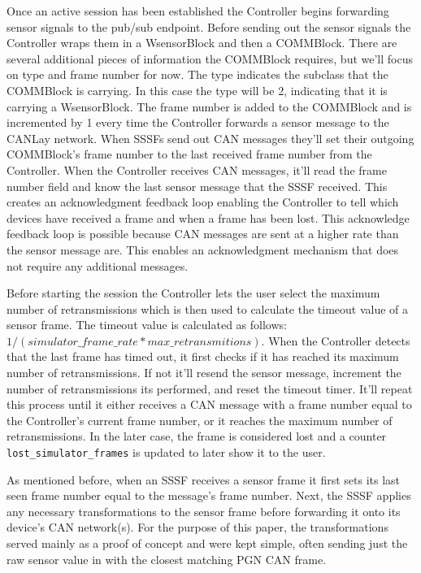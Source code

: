 \documentclass[letterpaper,twocolumn,12pt]{article}
\begin{document}
Once an active session has been established the Controller begins forwarding sensor signals to the pub/sub endpoint. Before sending out the sensor signals the Controller wraps them in a WsensorBlock and then a COMMBlock. There are several additional pieces of information the COMMBlock requires, but we'll focus on type and frame number for now. The type indicates the subclass that the COMMBlock is carrying. In this case the type will be 2, indicating that it is carrying a WsensorBlock. The frame number is added to the COMMBlock and is incremented by 1 every time the Controller forwards a sensor message to the CANLay network. When SSSFs send out CAN messages they’ll set their outgoing COMMBlock's frame number to the last received frame number from the Controller. When the Controller receives CAN messages, it'll read the frame number field and know the last sensor message that the SSSF received. This creates an acknowledgment feedback loop enabling the Controller to tell which devices have received a frame and when a frame has been lost. This acknowledge feedback loop is possible because CAN messages are sent at a higher rate than the sensor message are. This enables an acknowledgment mechanism that does not require any additional messages.

Before starting the session the Controller lets the user select the maximum number of retransmissions which is then used to calculate the timeout value of a sensor frame. The timeout value is calculated as follows: $1/(simulator\_frame\_rate * max\_retransmitions)$. When the Controller detects that the last frame has timed out, it first checks if it has reached its maximum number of retransmissions. If not it'll resend the sensor message, increment the number of retransmissions its performed, and reset the timeout timer. It’ll repeat this process until it either receives a CAN message with a frame number equal to the Controller's current frame number, or it reaches the maximum number of retransmissions. In the later case, the frame is considered lost and a counter \texttt{lost\_simulator\_frames} is updated to later show it to the user.

As mentioned before, when an SSSF receives a sensor frame it first sets its last seen frame number equal to the message's frame number. Next, the SSSF applies any necessary transformations to the sensor frame before forwarding it onto its device's CAN network(s). For the purpose of this paper, the transformations served mainly as a proof of concept and were kept simple, often sending just the raw sensor value in with the closest matching PGN CAN frame.
\end{document}
